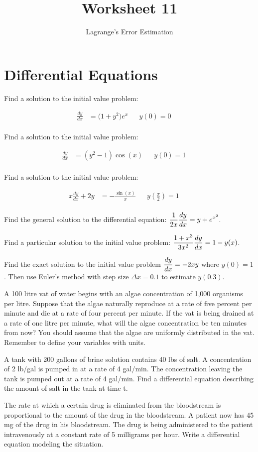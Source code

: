 \documentclass[paper=letter, 11pt]{article}
\title{Worksheet 11}
\subtitle{Lagrange's Error Estimation}
\newcommand{\IVProb}[1]{
	\begin{minipage}{0.5\textwidth}
		\Prob Find a solution to the initial value problem:
	\end{minipage}%
	\begin{minipage}{0.5\textwidth}
		\begin{align*}
			#1
		\end{align*}
	\end{minipage}
}
\begin{document}
\maketitle

\section*{Differential Equations}

\IVProb{
	\frac{dy}{dx} &= \Big(1 + y^2\Big)e^x && y(0) = 0 && \\
}\vfill

\IVProb{
	\frac{dy}{dx} &=  \left(y^2 - 1\right)\cos(x) && y(0) = 1 && \\
}\vfill


\IVProb{
	x\frac{dy}{dx} + 2y &= -\frac{\sin(x)}{x}  && y\left(\frac{\pi}{2}\right) = 1 && \\
}\vfill

\newpage

\Prob Find the general solution to the differential equation: \quad $\displaystyle \frac{1}{2x}\frac{dy}{dx} = y + e^{x^2}$.\vfill

\Prob Find a particular solution to the initial value problem: \quad $\displaystyle \frac{1 + x^3}{3x^2}\frac{dy}{dx} = 1 - y(x)$.\vfill

\Prob Find the exact solution to the initial value problem $\displaystyle\frac{dy}{dx} = -2xy$ where $y(0) = 1$.  Then use Euler's method with step size $\Delta x = 0.1$ to estimate $y(0.3)$.\vfill

\newpage

\Prob A 100 litre vat of water begins with an algae concentration of 1,000 organisms per litre.
Suppose that the algae naturally reproduce at a rate of five percent per minute and die
at a rate of four percent per minute. If the vat is being drained at a rate of one litre
per minute, what will the algae concentration be ten minutes from now? You should
assume that the algae are uniformly distributed in the vat. Remember to define your variables with units.\vfill

\Prob A tank with 200 gallons of brine solution contains 40 lbs of salt. A concentration of
2 lb/gal is pumped in at a rate of 4 gal/min. The concentration leaving the tank is
pumped out at a rate of 4 gal/min. Find a differential equation describing the amount
of salt in the tank at time t.\vfill

\Prob The rate at which a certain drug is eliminated from the bloodstream is proportional to
the amount of the drug in the bloodstream. A patient now has 45 mg of the drug in his
bloodstream. The drug is being administered to the patient intravenously at a constant
rate of 5 milligrams per hour. Write a differential equation modeling the situation.\vfill
\end{document}
